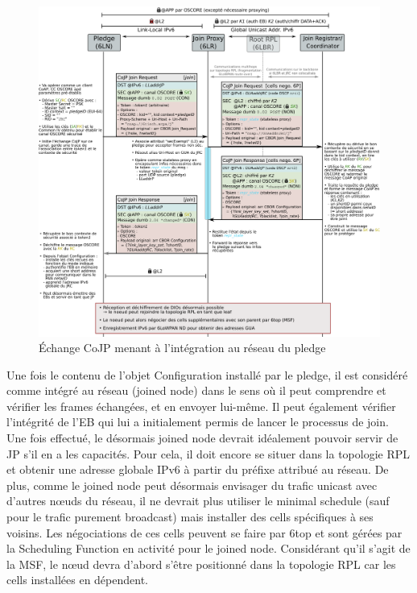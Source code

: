 \documentclass[]{report}
\begin{document}
\vspace{0.2cm}
	\begin{figure}[!h]
	\centering
	\includegraphics[width=\linewidth]{Joining_phase_part2}
	\caption{Échange CoJP menant à l'intégration au réseau du pledge}
	\label{fig:join_part2}
	\end{figure}
\vspace{0.2cm}

\newpage

Une fois le contenu de l'objet Configuration installé par le pledge, il est considéré comme intégré au réseau (joined node) dans le sens où il peut comprendre et vérifier les frames échangées, et en envoyer lui-même. Il peut également vérifier l'intégrité de l'EB qui lui a initialement permis de lancer le processus de join. Une fois effectué, le désormais joined node devrait idéalement pouvoir servir de JP s'il en a les capacités. Pour cela, il doit encore se situer dans la topologie RPL et obtenir une adresse globale IPv6 à partir du préfixe attribué au réseau. De plus, comme le joined node peut désormais envisager du trafic unicast avec d'autres nœuds du réseau, il ne devrait plus utiliser le minimal schedule (sauf pour le trafic purement broadcast) mais installer des cells spécifiques à ses voisins. Les négociations de ces cells peuvent se faire par 6top et sont gérées par la Scheduling Function en activité pour le joined node. Considérant qu'il s'agit de la MSF, le nœud devra d'abord s'être positionné dans la topologie RPL car les cells installées en dépendent.\\
\end{document}

